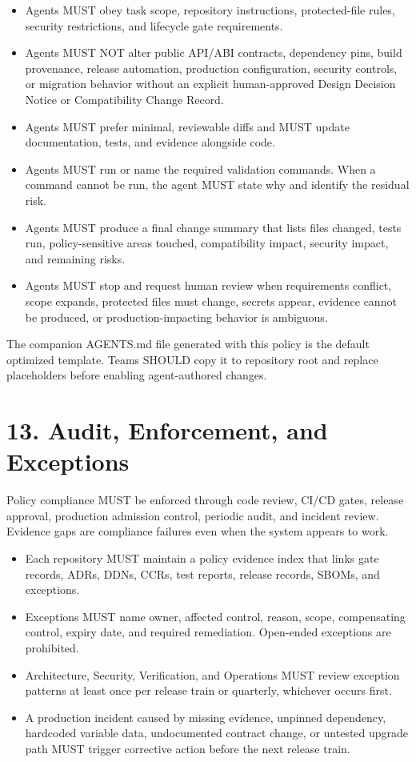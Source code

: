 \documentclass[11pt]{article}
\begin{document}
\begin{itemize}
  \item Agents MUST obey task scope, repository instructions, protected-file rules, security restrictions, and lifecycle gate requirements.
  \item Agents MUST NOT alter public API/ABI contracts, dependency pins, build provenance, release automation, production configuration, security controls, or migration behavior without an explicit human-approved Design Decision Notice or Compatibility Change Record.
  \item Agents MUST prefer minimal, reviewable diffs and MUST update documentation, tests, and evidence alongside code.
  \item Agents MUST run or name the required validation commands. When a command cannot be run, the agent MUST state why and identify the residual risk.
  \item Agents MUST produce a final change summary that lists files changed, tests run, policy-sensitive areas touched, compatibility impact, security impact, and remaining risks.
  \item Agents MUST stop and request human review when requirements conflict, scope expands, protected files must change, secrets appear, evidence cannot be produced, or production-impacting behavior is ambiguous.
\end{itemize}
The companion AGENTS.md file generated with this policy is the default optimized template. Teams SHOULD copy it to repository root and replace placeholders before enabling agent-authored changes.


\hypertarget{sec-audit-enforcement}{}
\section*{13. Audit, Enforcement, and Exceptions}
Policy compliance MUST be enforced through code review, CI/CD gates, release approval, production admission control, periodic audit, and incident review. Evidence gaps are compliance failures even when the system appears to work.

\begin{itemize}
  \item Each repository MUST maintain a policy evidence index that links gate records, ADRs, DDNs, CCRs, test reports, release records, SBOMs, and exceptions.
  \item Exceptions MUST name owner, affected control, reason, scope, compensating control, expiry date, and required remediation. Open-ended exceptions are prohibited.
  \item Architecture, Security, Verification, and Operations MUST review exception patterns at least once per release train or quarterly, whichever occurs first.
  \item A production incident caused by missing evidence, unpinned dependency, hardcoded variable data, undocumented contract change, or untested upgrade path MUST trigger corrective action before the next release train.
\end{itemize}
\end{document}
